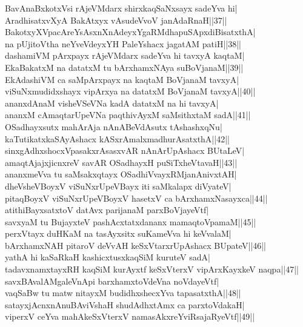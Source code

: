 \documentclass{article}
\begin{document}
BavAnaBxkotxVsi rAjeVMdarx shirxkaqSaNxsayx sadeYva hi|\\
AradhisatxvXyA BakAtxyx vAsudeVvoV janAdaRnaH||37||\\
BakotxyXVpacAreYsAsxnXnAdeyxYgaRMdhapuSApxdiBisatxthA|\\
na pUjitoVtha neYveVdeyxYH PaleYshacx jagatAM patiH||38||\\
dashamiVM pArxpayx rAjeVMdarx sadeYva hi tavxyA kaqtaM|\\
EkaBakatxM na datatxM tu bArxhamxNAya suBoVjanaM||39||\\
EkAdashiVM  ca saMpArxpayx na kaqtaM BoVjanaM tavxyA|\\
viSuNxmudidxshayx vipArxya na datatxM BoVjanaM tavxyA||40||\\
ananxdAnaM visheVSeVNa kadA datatxM na hi tavxyA|\\
ananxM cAmaqtarUpeVNa paqthivAyxM saMsithxtaM sadA||41||\\
OSadhayxsutx mahArAja nAnABeVdAsutx tAshashxqNu|\\
kaTutikatxkaSAyAshacx kASxrAmalxmadhurAsatxthA||42||\\
sinxgAdhxshocxVpasakxrAsasxvAR nAnArUpAshacx BUtaLeV|\\
amaqtAjajxjicnxreV savAR OSadhayxH puSiTxheVtavaH||43||\\
ananxmeVva tu saMsakxqtayx OSadhiVvayxRMjanAnivxtAH|\\
dheVsheVBoyxV viSuNxrUpeVBayx iti saMkalapx diVyateV|\\
pitaqBoyxV viSuNxrUpeVBoyxV hasetxV  ca bArxhamxNasayxca||44||\\
atithiBayxsatxtoV datAvx parijanaM parxBoVjayeVtf|\\
savxyaM tu BujayxteV pashAcxtatxdananx mamaqtoVpamaM||45||\\
perxVtayx duHKaM na tasAyxsitx suKameVva hi keVvalaM|\\
bArxhamxNAH pitaroV deVvAH keSxVtarxrUpAshacx BUpateV||46||\\
yathA hi kaSaRkaH kashicxtusxkaqSiM kuruteV sadA|\\
tadavxnamxtayxRH kaqSiM kurAyxtf keSxVterxV vipArxKayxkeV naqpa||47||\\
savxBAvalAMgaleVnApi barxhamxtoVdeVna noVdayeVtf|\\
vaqSaBw tu matw nitayxM budidhxshecxYva tapasatxthA||48||\\
satayxjAcnxnAnuBAviVshaH shudAdhxtAmx ca parxtoVdakaH|\\
viperxV ceYva mahAkeSxVterxV namasAkxreYviRsajaRyeVtf||49||\\
\end{document}
